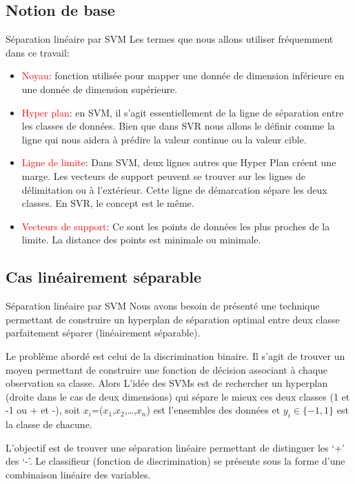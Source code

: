 \documentclass{bredelebeamer}
\begin{document}
\subsection{Notion de base }
\begin{frame}{Séparation linéaire par SVM}
Les termes que nous allons utiliser fréquemment dans ce travail:
\begin{itemize} 
        \item \textcolor{red}{Noyau}: fonction utilisée pour mapper une donnée de dimension inférieure en une donnée de dimension supérieure.
        \item \textcolor{red}{Hyper plan}: en SVM, il s’agit essentiellement de la ligne de séparation entre les classes de données. Bien que dans SVR nous allons le définir comme la ligne qui nous aidera à prédire la valeur continue ou la valeur cible.
        \item \textcolor{red}{Ligne de limite}: Dans SVM, deux lignes autres que Hyper Plan créent une marge. Les vecteurs de support peuvent se trouver sur les lignes de délimitation ou à l’extérieur. Cette ligne de démarcation sépare les deux classes. En SVR, le concept est le même.
        \item \textcolor{red}{Vecteurs de support}: Ce sont les points de données les plus proches de la limite. La distance des points est minimale ou minimale.        
\end{itemize}
\end{frame}

\subsection{Cas linéairement séparable }
\begin{frame}{Séparation linéaire par SVM}
Nous avons besoin de présenté une technique permettant de construire un hyperplan de séparation optimal entre deux classe parfaitement séparer (linéairement séparable).\vspace{2\baselineskip}

Le problème abordé est celui de la discrimination binaire. Il s’agit de trouver un moyen permettant de construire une fonction de décision associant à chaque observation sa classe. Alors L’idée des SVMs est de rechercher un hyperplan (droite dans le cas de deux dimensions) qui sépare le mieux ces deux classes (1 et -1 ou + et  -), soit  $x_{i}$=($x_{1}$,$x_{2}$,…,$x_{n}$) est l’ensembles des données et $ y_{i}\in\{-1,1\} $  est la classe de chacune.\vspace{2\baselineskip}


L’objectif est de trouver une séparation linéaire permettant de distinguer les ‘+’ des ‘-’. Le classifieur (fonction de discrimination) se présente sous la forme d’une combinaison linéaire des variables.
\end{frame}
\end{document}

